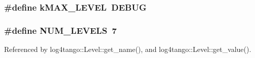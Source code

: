 \subsubsection[{k\-M\-A\-X\-\_\-\-L\-E\-V\-E\-L}]{\setlength{\rightskip}{0pt plus 5cm}\#define k\-M\-A\-X\-\_\-\-L\-E\-V\-E\-L~D\-E\-B\-U\-G}\label{Level_8cpp_a6cf223d5e28c6cb9d4d8bd10a92414f5}
\subsubsection[{N\-U\-M\-\_\-\-L\-E\-V\-E\-L\-S}]{\setlength{\rightskip}{0pt plus 5cm}\#define N\-U\-M\-\_\-\-L\-E\-V\-E\-L\-S~7}\label{Level_8cpp_ab122432988c73c06becf1ce34077e43b}


Referenced by log4tango\-::\-Level\-::get\-\_\-name(), and log4tango\-::\-Level\-::get\-\_\-value().

